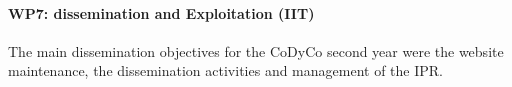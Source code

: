 \paragraph{WP7: dissemination and Exploitation (IIT)}

The main dissemination objectives for the CoDyCo second year were the website maintenance, the dissemination activities and management of the IPR.
